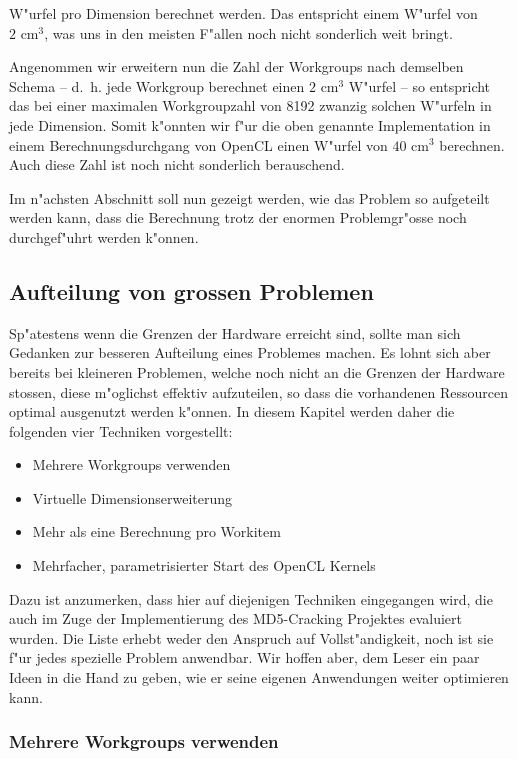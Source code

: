 \begin{refsection}
\noindent W"urfel pro Dimension berechnet werden. Das entspricht einem W"urfel von 
$2\textrm{ cm}^{3}$, was uns in den meisten F"allen noch nicht sonderlich weit bringt.

Angenommen wir erweitern nun die Zahl der Workgroups nach demselben Schema --
d.~h. jede Workgroup berechnet einen $2\textrm{ cm}^{3}$ W"urfel -- so
entspricht das bei einer maximalen Workgroupzahl von 8192 zwanzig solchen
W"urfeln in jede Dimension. Somit k"onnten wir f"ur die oben genannte
Implementation in einem Berechnungsdurchgang von OpenCL einen W"urfel von
$40\textrm{ cm}^{3}$ berechnen. Auch diese Zahl ist noch nicht sonderlich
berauschend. 

Im n"achsten Abschnitt soll nun gezeigt werden, wie das Problem so aufgeteilt werden kann,
dass die Berechnung trotz der enormen Problemgr"osse noch durchgef"uhrt werden
k"onnen.

\subsection{Aufteilung von grossen Problemen}

Sp"atestens wenn die Grenzen der Hardware erreicht sind, sollte man sich
Gedanken zur besseren Aufteilung eines Problemes machen. Es lohnt sich aber
bereits bei kleineren Problemen, welche noch nicht an die Grenzen
der Hardware stossen, diese m"oglichst effektiv aufzuteilen, so dass die
vorhandenen Ressourcen optimal ausgenutzt werden k"onnen.  In diesem Kapitel
werden daher die folgenden vier Techniken vorgestellt:

\begin{itemize}
 \item Mehrere Workgroups verwenden
 \item Virtuelle Dimensionserweiterung
 \item Mehr als eine Berechnung pro Workitem
 \item Mehrfacher, parametrisierter Start des OpenCL Kernels
\end{itemize}

\noindent Dazu ist anzumerken, dass hier auf diejenigen Techniken eingegangen wird, die
auch im Zuge der Implementierung des MD5-Cracking Projektes
evaluiert wurden. Die Liste erhebt weder den Anspruch auf Vollst"andigkeit,
noch ist sie f"ur jedes spezielle Problem anwendbar. Wir hoffen aber, dem Leser
ein paar Ideen in die Hand zu geben, wie er seine eigenen Anwendungen weiter
optimieren kann.

\subsubsection{Mehrere Workgroups verwenden}


\end{refsection}
